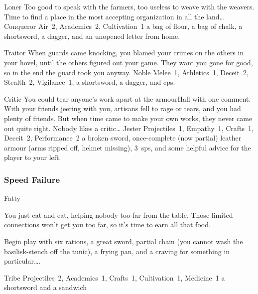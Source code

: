\begin{multicols}{2}
\begin{itemize}
    {Loner}%
    {Too good to speak with the farmers, too useless to weave with the weavers.
      Time to find a place in the most accepting organization in all the land\ldots}%
    {Conqueror}%
    {
      Air~2, Academics~2, Cultivation~1
    }%
    {a bag of flour, a bag of chalk, a shortsword, a dagger, and an unopened letter from home.}%

    {Traitor}%
    {
      When guards came knocking, you blamed your crimes on the others in your hovel, until the others figured out your game.
      They want you gone for good, so in the end the \gls{guard} took you anyway.
    }%
    {Noble}%
    {
      Melee~1, Athletics~1, Deceit~2, Stealth~2, Vigilance~1,
    }%
    {a shortsword, a dagger, and  \glspl{cp}.}%

    {Critic}%
    {
      You could tear anyone's work apart at the \gls{armourHall} with one comment.
      With your friends jeering with you, artisans fell to rage or tears, and you had plenty of friends.
      But when time came to make your own works, they never came out quite right.
      Nobody likes a critic\ldots
    }%
    {Jester}%
    {
      Projectiles~1, Empathy~1, Crafts~1, Deceit~2, Performance~2
    }%
    {a broken sword, once-complete (now partial) leather armour (arms ripped off, helmet missing), 3~\glspl{sp}, and some helpful advice for the player to your left.}%

\end{itemize}

\needspace{16em}
\subsubsection{Speed Failure}

\begin{itemize}

    {Fatty}%
    {
      You just eat and eat, helping nobody too far from the table.
      Those limited connections won't get you too far, so it's time to earn all that food.

      Begin play with six rations, a great sword, partial chain (you cannot wash the \gls{basilisk}-stench off the tunic), a frying pan, and a craving for something in particular\ldots.
    }%
    {Tribe}%
    {Projectiles~2, Academics~1, Crafts~1, Cultivation~1, Medicine~1}%
    {a shortsword and a sandwich}%


\end{itemize}
\end{multicols}
